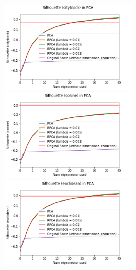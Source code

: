 \documentclass[11pt]{scrartcl} %
\theoremstyle{plain}
\begin{document}
\begin{figure}[H]
\centering
\includegraphics[width=0.6\textwidth]{figures/rpcatrial3cityblock.png}\\
\includegraphics[width=0.6\textwidth]{figures/rpcatrial3cosine.png}\\
\includegraphics[width=0.6\textwidth]{figures/rpcatrial3euclidean.png}\\
\end{figure}
\end{document}

